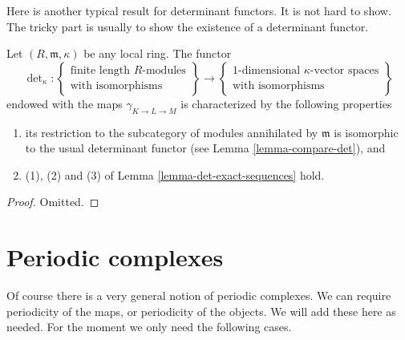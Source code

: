 \medskip\noindent
Here is another typical result for determinant functors.
It is not hard to show. The tricky part is usually to show the
existence of a determinant functor.

\begin{lemma}
\label{lemma-uniqueness-det}
Let $(R, \mathfrak m, \kappa)$ be any local ring.
The functor
$$
\det\nolimits_\kappa :
\left\{
\begin{matrix}
\text{finite length }R\text{-modules} \\
\text{with isomorphisms}
\end{matrix}
\right\}
\longrightarrow
\left\{
\begin{matrix}
1\text{-dimensional }\kappa\text{-vector spaces} \\
\text{with isomorphisms}
\end{matrix}
\right\}
$$
endowed with the maps $\gamma_{K \to L \to M}$ is characterized by
the following properties
\begin{enumerate}
\item its restriction to the subcategory of modules annihilated
by $\mathfrak m$ is isomorphic to the usual determinant functor
(see Lemma \ref{lemma-compare-det}), and
\item (1), (2) and (3) of Lemma \ref{lemma-det-exact-sequences}
hold.
\end{enumerate}
\end{lemma}

\begin{proof}
Omitted.
\end{proof}







\section{Periodic complexes}
\label{section-periodic-complexes}

\noindent
Of course there is a very general notion of periodic complexes.
We can require periodicity of the maps, or periodicity of the objects.
We will add these here as needed. For the moment we only need
the following cases.

